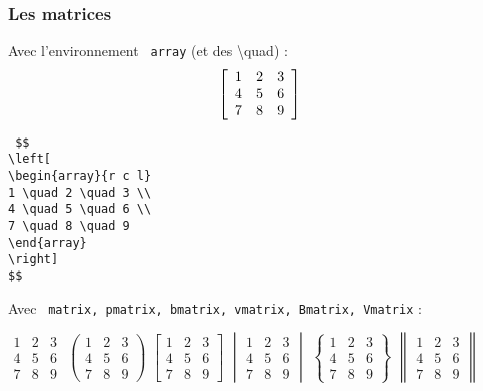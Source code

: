 \documentclass{report}
\begin{document}
\newpage

\subsubsection*{Les matrices}

Avec l'environnement \texttt{ array}  (et des \textbackslash{}quad) :
$$
\left[
\begin{array}{r c l}
1 \quad 2 \quad 3 \\
4 \quad 5 \quad 6 \\
7 \quad 8 \quad 9
\end{array}
\right] $$

\texttt{
\$\$ \\
\textbackslash{}left[ \\
\textbackslash{}begin\{array\}\{r c l\} \\
1 \textbackslash{}quad 2 \textbackslash{}quad 3 \textbackslash{}\textbackslash{} \\
4 \textbackslash{}quad 5 \textbackslash{}quad 6 \textbackslash{}\textbackslash{} \\
7 \textbackslash{}quad 8 \textbackslash{}quad 9 \\
\textbackslash{}end\{array\} \\
\textbackslash{}right] \\
\$\$ 
}

Avec \texttt{ matrix, pmatrix, bmatrix, vmatrix, 	Bmatrix, Vmatrix} :

$
\begin{matrix}
1 & 2 & 3 \\
4 & 5 & 6 \\
7 & 8 & 9
\end{matrix}
$
\quad
$
\begin{pmatrix}
1 & 2 & 3 \\
4 & 5 & 6 \\
7 & 8 & 9
\end{pmatrix}
$
\quad
$
\begin{bmatrix}
1 & 2 & 3 \\
4 & 5 & 6 \\
7 & 8 & 9
\end{bmatrix}
$
\quad
$
\begin{vmatrix}
1 & 2 & 3 \\
4 & 5 & 6 \\
7 & 8 & 9
\end{vmatrix}
$
\quad
$
\begin{Bmatrix}
1 & 2 & 3 \\
4 & 5 & 6 \\
7 & 8 & 9
\end{Bmatrix}
$
\quad
$
\begin{Vmatrix}
1 & 2 & 3 \\
4 & 5 & 6 \\
7 & 8 & 9
\end{Vmatrix}
$
\end{document}
